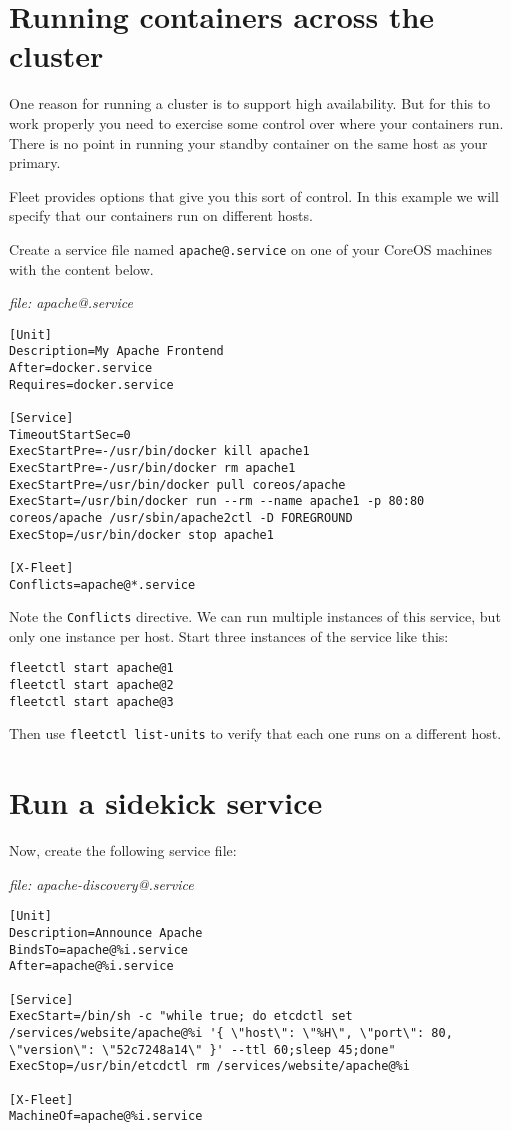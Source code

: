 \documentclass{article}
\begin{document}
\section{Running containers across the cluster}
One reason for running a cluster is to support high availability. But for this to work properly you need to exercise some control over where your containers run.  There is no point in running your standby container on the same host as your primary.

Fleet provides options that give you this sort of control.  In this example we will specify that our containers run on different hosts.

Create a service file named \texttt{apache@.service} on one of your CoreOS machines with the content below.

\emph{file: apache@.service}
\begin{verbatim}
[Unit]
Description=My Apache Frontend
After=docker.service
Requires=docker.service

[Service]
TimeoutStartSec=0
ExecStartPre=-/usr/bin/docker kill apache1
ExecStartPre=-/usr/bin/docker rm apache1
ExecStartPre=/usr/bin/docker pull coreos/apache
ExecStart=/usr/bin/docker run --rm --name apache1 -p 80:80 coreos/apache /usr/sbin/apache2ctl -D FOREGROUND
ExecStop=/usr/bin/docker stop apache1

[X-Fleet]
Conflicts=apache@*.service
\end{verbatim}

Note the \texttt{Conflicts} directive.  We can run multiple instances of this service, but only one instance per host.  Start three instances of the service like this:

\begin{verbatim}
fleetctl start apache@1
fleetctl start apache@2
fleetctl start apache@3
\end{verbatim}

Then use \texttt{fleetctl list-units} to verify that each one runs on a different host.

\section{Run a sidekick service}
Now, create the following service file:

\emph{file: apache-discovery@.service}
\begin{verbatim}
[Unit]
Description=Announce Apache
BindsTo=apache@%i.service
After=apache@%i.service

[Service]
ExecStart=/bin/sh -c "while true; do etcdctl set /services/website/apache@%i '{ \"host\": \"%H\", \"port\": 80, \"version\": \"52c7248a14\" }' --ttl 60;sleep 45;done"
ExecStop=/usr/bin/etcdctl rm /services/website/apache@%i

[X-Fleet]
MachineOf=apache@%i.service
\end{verbatim}
\end{document}
